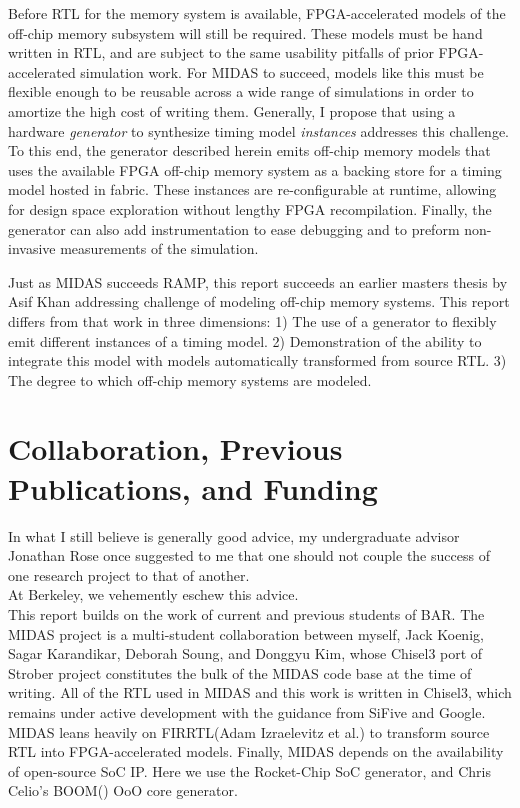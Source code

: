 Before RTL for the memory system is available, FPGA-accelerated models of the
off-chip memory subsystem will still be required. These models must be hand
written in RTL, and are subject to the same usability pitfalls of prior
FPGA-accelerated simulation work. For MIDAS to succeed, models like this must
be flexible enough to be reusable across a wide range of simulations in order
to amortize the high cost of writing them. Generally, I propose that using a
hardware \emph{generator} to synthesize timing model \emph{instances} addresses
this challenge. To this end, the generator described herein emits off-chip
memory models that uses the available FPGA off-chip memory system as a backing
store for a timing model hosted in fabric. These instances are re-configurable
at runtime, allowing for design space exploration without lengthy FPGA
recompilation. Finally, the generator can also add instrumentation to ease
debugging and to preform non-invasive measurements of the simulation.

Just as MIDAS succeeds RAMP, this report succeeds an earlier masters thesis by
Asif Khan\cite{khanmasters} addressing challenge of modeling off-chip memory
systems. This report differs from that work in three dimensions: 1) The use of
a generator to flexibly emit different instances of a timing model. 2)
Demonstration of the ability to integrate this model with models automatically
transformed from source RTL. 3) The degree to which off-chip memory systems are
modeled.

\section{Collaboration, Previous Publications, and Funding}

In what I still believe is generally good advice, my undergraduate advisor
Jonathan Rose once suggested to me that one should not couple the success of
one research project to that of another.\\

At Berkeley, we vehemently eschew this advice.\\

This report builds on the work of current and previous students of BAR.  The
MIDAS project is a multi-student collaboration between myself, Jack Koenig,
Sagar Karandikar, Deborah Soung, and Donggyu Kim, whose Chisel3 port of
Strober\cite{strober} project constitutes the bulk of the MIDAS code base at
the time of writing. All of the RTL used in MIDAS and this work is written in
Chisel3\cite{chisel}, which remains under active development with the guidance
from SiFive and Google. MIDAS leans heavily on FIRRTL\cite{firrtl}(Adam
Izraelevitz et al.) to transform source RTL into FPGA-accelerated models.
Finally, MIDAS depends on the availability of open-source SoC IP. Here we use
the Rocket-Chip\cite{rocketchip} SoC generator, and Chris Celio's
BOOM(\cite{boom}) OoO core generator.

